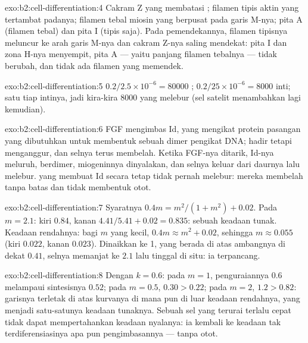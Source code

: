 \begin{solution}{exo:b2:cell-differentiation:4}
Cakram Z yang membatasi ; filamen tipis aktin yang tertambat
padanya; filamen tebal miosin yang berpusat pada garis M-nya; pita A
(filamen tebal) dan pita I (tipis saja). Pada pemendekannya, filamen
tipisnya meluncur ke arah garis M-nya dan cakram Z-nya saling
mendekat: pita I dan zona H-nya menyempit, pita A --- yaitu panjang
filamen tebalnya --- tidak berubah, dan tidak ada filamen yang memendek.
\end{solution}

\begin{solution}{exo:b2:cell-differentiation:5}
$0.2/2.5\times 10^{-6} = \num{80000}$ ; $0.2/25\times 10^{-6}
= \num{8000}$ inti; satu  tiap intinya, jadi kira-kira
\num{8000}  yang melebur (sel satelit menambahkan lagi kemudian).
\end{solution}

\begin{solution}{exo:b2:cell-differentiation:6}
FGF mengimbas Id, yang mengikat protein pasangan yang dibutuhkan 
untuk membentuk sebuah dimer pengikat DNA;  hadir tetapi
menganggur, dan selnya terus membelah. Ketika FGF-nya ditarik, Id-nya
meluruh,  berdimer, miogeninnya dinyalakan, dan selnya keluar dari
daurnya lalu melebur.  yang membuat Id secara tetap tidak pernah
melebur: mereka membelah tanpa batas dan tidak membentuk otot.
\end{solution}

\begin{solution}{exo:b2:cell-differentiation:7}
Syaratnya $0.4m = m^{2}/(1 + m^{2}) + 0.02$. Pada $m = 2.1$: kiri
$0.84$, kanan $4.41/5.41 + 0.02 = 0.835$: sebuah keadaan tunak. Keadaan
rendahnya: bagi $m$ yang kecil, $0.4m \approx m^{2} + 0.02$, sehingga
$m \approx
0.055$ (kiri $0.022$, kanan $0.023$). Dinaikkan ke 1, yang
berada di atas ambangnya di dekat $0.41$, selnya memanjat ke $2.1$ lalu
tinggal di situ: ia terpancang.
\end{solution}

\begin{solution}{exo:b2:cell-differentiation:8}
Dengan $k = 0.6$: pada $m = 1$, penguraiannya $0.6$ melampaui
sintesisnya $0.52$; pada $m = 0.5$, $0.30 > 0.22$; pada $m = 2$,
$1.2 > 0.82$: garisnya terletak di atas kurvanya di mana pun di luar
keadaan rendahnya, yang menjadi satu-satunya keadaan tunaknya. Sebuah
sel yang  terurai terlalu cepat tidak dapat mempertahankan
keadaan nyalanya: ia kembali ke keadaan tak terdiferensiasinya apa pun
pengimbasannya --- tanpa otot.
\end{solution}

